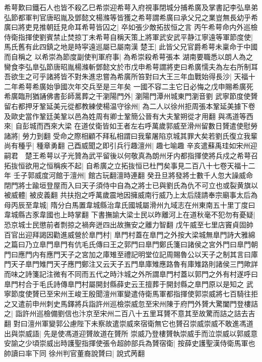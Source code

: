 希萼歎曰鐵石人也皆不殺乙巳希崇迎希萼入府視事閉城分捕希廣及掌書記李弘臯弟弘節都軍判官唐昭胤及鄧懿文楊滌等皆獲之希萼謂希廣曰承父兄之業豈無長幼乎希廣曰將吏見推朝廷見命耳希萼皆囚之|{
	卒如張少敵拓拔恒之言}
丙午希萼命内外巡檢侍衛指揮使劉賓禁止焚掠丁未希萼自稱天策上將軍武安武平静江寧遠等軍節度使|{
	馬氏舊有此四鎮之地是時寜遠巡屬已屬南漢}
楚王|{
	此皆父兄官爵希萼未稟命于中國而自稱之}
以希崇為節度副使判軍府事|{
	為希崇殺希萼張本}
湖南要職悉以朗人為之臠食李弘臯弘節唐昭胤楊滌斬鄧懿文於市戊申希萼謂將吏曰希廣懦夫為左右所制耳吾欲生之可乎諸將皆不對朱進忠嘗為希廣所笞對曰大王三年血戰始得長沙|{
	天福十二年希萼希廣始爭國次年交兵至是三年矣}
一國不容二主它日必悔之戊申賜希廣死希廣臨刑猶誦佛書彭師暠葬之干瀏陽門外|{
	瀏陽門潭州城東門瀏音劉}
武寧節度使贇留右都押牙鞏延美元從都教練使楊温守徐州|{
	為二人以徐州拒周張本鞏延美據下卷及歐史當作鞏廷美鞏以邑為姓周有卿士鞏簡公晉有大夫鞏朔從才用翻}
與馮道等西來|{
	自彭城而西來大梁}
在道仗衛皆如王者左右呼萬歲郭威至滑州留數日贇遣使慰勞諸將|{
	勞力到翻}
受命之際相顧不拜私相謂曰我輩屠陷京城其罪大矣若劉氏復立我輩尚有種乎|{
	種章勇翻}
己酉威聞之即引兵行趣澶州|{
	趣七喻趣}
辛亥遣蘇禹珪如宋州迎嗣君　楚王希萼以子光贊為武平留後以何敬真為朗州牙内都指揮使將兵戍之希萼召拓抜恒欲用之恒稱疾不起|{
	自希廣之立拓抜恒已杜門矣事見二百八十七卷天福十二年}
壬子郭威度河館于澶州|{
	館古玩翻澶時連翻}
癸丑旦將發將士數千人忽大譟威命閉門將士踰垣登屋而入曰天子須侍中自為之將士已與劉氏為仇不可立也或裂黄旗以被威體|{
	被皮義翻}
共扶抱之呼萬歲震地因擁威南行威乃上太后牋請奉宗廟事太后為母丙辰至韋城|{
	隋分白馬置韋城縣治韋氏國城屬滑州九域志在州東南五十里丁度曰韋城縣古豕韋國也上時掌翻}
下書撫諭大梁士民以昨離河上在道秋毫不犯勿有憂疑|{
	恐京城士民懲前者剽掠之禍奔迸四出故撫安之離力智翻}
戊午威至七里店竇貞固帥百官出迎拜謁因勸進威營於臯門村|{
	臯門村蓋在臯門之外按大梁城無臯門詩大雅綿之篇曰乃立臯門臯門有伉毛氏傳曰王之郭門曰臯門鄭氏箋曰諸侯之宮外門曰臯門朝門曰應門内有應門天子之宮加之庫雉至禮記明堂位記周賜魯公以天子之制其言曰庫門天子臯門雉門天子應門鄭注又云天子五門臯庫雉應路魯有庫雉路則諸侯三門歟詳而味之詩箋記注微有不同而五代之時汴城之外所謂臯門村蓋以郭門之外有村遂呼曰臯門村合于毛氏詩傳臯門村屬開封縣薛史云王擅葬于開封縣之臯門原以是知之}
武寧節度使贇已至宋州王峻王殷聞澶州軍變遣侍衛馬軍都指揮使郭崇威將七百騎往拒之又遣前申州刺史馬鐸將兵詣許州巡檢崇威忽至宋州陳于府門外贇大驚闔門登樓詰之|{
	詣許州巡檢備劉信也汴京至宋州二百八十五里耳贇不意其至故驚而詰之詰去吉翻}
對曰澶州軍變郭公慮陛下未察故遣崇威來宿衛無它也贇召崇威崇威不敢進馮道出與崇威語|{
	先是使馮道迎贇故道在贇所}
崇威乃登樓贇執崇威手而泣崇威以郭威意安諭之少頃崇威出時護聖指揮使張令超帥部兵為贇宿衛|{
	按薛史護聖漢侍衛馬軍也帥讀曰率下同}
徐州判官董裔說贇曰|{
	說式苪翻}
